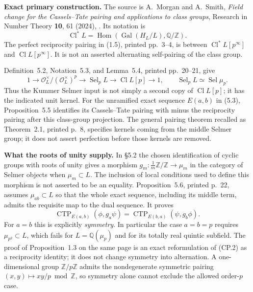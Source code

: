 \documentclass[11pt,a4paper]{article}
\theoremstyle{definition}
\renewcommand{\paragraph}[1]{\par\smallskip\noindent\textbf{#1}\quad\ignorespaces}
\begin{document}
\paragraph{Exact primary construction.}
The source is A.~Morgan and A.~Smith, \emph{Field change for the
Cassels--Tate pairing and applications to class groups}, Research in
Number Theory \textbf{10}, 61 (2024),
.
Its notation is
\[
 \operatorname{Cl}^{*}L=
 \operatorname{Hom}(\operatorname{Gal}(H_L/L),\mathbb Q/\mathbb Z).
\]
The perfect reciprocity pairing in (1.5), printed pp.~3--4, is between
$\operatorname{Cl}^{*}L[p^\infty]$ and
$\operatorname{Cl}L[p^\infty]$.  It is not an asserted alternating
self-pairing of the class group.

Definition~5.2, Notation~5.3, and Lemma~5.4, printed pp.~20--21, give
\[
 1\longrightarrow\mathcal O_L^\times/(\mathcal O_L^\times)^p
 \longrightarrow\operatorname{Sel}_pL
 \longrightarrow\operatorname{Cl}L[p]\longrightarrow1,
 \qquad
 \operatorname{Sel}_pL\simeq\operatorname{Sel}\mu_p.
 \tag{CP.1}
\]
Thus the Kummer Selmer input is not simply a second copy of
$\operatorname{Cl}L[p]$; it has the indicated unit kernel.
For the unramified exact sequence $E(a,b)$ in (5.3), Proposition~5.5
identifies its Cassels--Tate pairing with minus the reciprocity pairing
after this class-group projection.  The general pairing theorem recalled
as Theorem~2.1, printed p.~8, specifies kernels coming from the middle
Selmer group; it does not assert perfection before those kernels are
removed.

\paragraph{What the roots of unity supply.}
In \S5.2 the chosen identification of cyclic groups with roots of unity
gives a morphism $g_m:\frac1m\mathbb Z/\mathbb Z\to\mu_m$ in the
category of Selmer objects when $\mu_m\subset L$.  The inclusion of local
conditions used to define this morphism is not asserted to be an equality.
Proposition~5.6, printed p.~22, assumes $\mu_{ab}\subset L$ so that the
whole exact sequence, including its middle term, admits the requisite
map to the dual sequence.  It proves
\[
 \operatorname{CTP}_{E(a,b)}(\phi,g_a\psi)
 =\operatorname{CTP}_{E(b,a)}(\psi,g_b\phi).
 \tag{CP.2}
\]
For $a=b$ this is explicitly \emph{symmetry}.  In particular the case
$a=b=p$ requires $\mu_{p^2}\subset L$, which fails for
$L=\mathbb Q(\mu_p)$ and for its totally real quintic subfield.
The proof of Proposition~1.3 on the same page is an exact reformulation
of (CP.2) as a reciprocity identity; it does not change symmetry into
alternation.  A one-dimensional group $\mathbb Z/p\mathbb Z$ admits the
nondegenerate symmetric pairing $(x,y)\mapsto xy/p\bmod\mathbb Z$, so
symmetry alone cannot exclude the allowed order-$p$ case.
\end{document}
